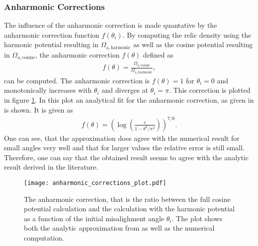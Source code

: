 \documentclass[twoside,a4paper, 12pt]{article}
\numberwithin{equation}{section}
\begin{document}
\subsubsection{Anharmonic Corrections}
The influence of the anharmonic correction is made quantative
by the anharmonic correction function $f(\theta_i)$.
By computing the relic density using the harmonic potential resulting in $\Omega_\mathrm{a, harmonic}$ as well as the cosine potential resulting in $\Omega_\mathrm{a, cosine}$, the
anharmonic correction $f(\theta)$ defined as
\begin{align}
    f(\theta) = \frac{\Omega_\mathrm{a, cosine}}{\Omega_\mathrm{a, harmonic}},
\end{align}
can be computed.
The anharmonic correction is $f(\theta) = 1$ for $\theta_i = 0$ and
monotonically increases with $\theta_i$ and
diverges at $\theta_i = \pi$.
This correction is plotted in figure \ref{fig:anharmonic_correction_plot}.
In this plot an analytical fit for the anharmonic correction,
as given in \cite[Eq. 70]{MarshAxionCosmo} is shown. It is given as
\begin{align}
    f(\theta) = \left( \log \left( \frac{e}{1 - \theta^2 / \pi^2} \right) \right)^{7/6}.
\end{align}
One can see, that the approximation does agree with the numerical result for small angles very well and that for larger values
the relative error is still small. Therefore, one can say that the obtained result seems to agree with the analytic result derived
in the literature.
\begin{figure}[H]
    \centering
    \texttt{[image: anharmonic\_corrections\_plot.pdf]}
    \caption{
    The anharmonic correction, that is the ratio between the
    full cosine potential calculation and the calculation with
    the harmonic potential as a function of the initial misalighment angle $\theta_i$.
    The plot shows both the analytic approximation from \cite{MarshAxionCosmo} as well as the numerical computation.
    }
    \label{fig:anharmonic_correction_plot}
\end{figure}
\end{document}
